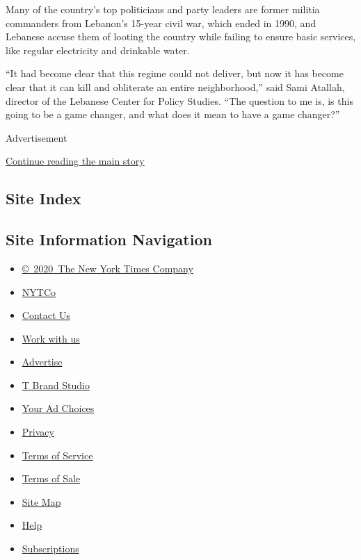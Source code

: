Many of the country's top politicians and party leaders are former
militia commanders from Lebanon's 15-year civil war, which ended in
1990, and Lebanese accuse them of looting the country while failing to
ensure basic services, like regular electricity and drinkable water.

``It had become clear that this regime could not deliver, but now it has
become clear that it can kill and obliterate an entire neighborhood,''
said Sami Atallah, director of the Lebanese Center for Policy Studies.
``The question to me is, is this going to be a game changer, and what
does it mean to have a game changer?''

Advertisement

\protect\hyperlink{after-bottom}{Continue reading the main story}

\hypertarget{site-index}{%
\subsection{Site Index}\label{site-index}}

\hypertarget{site-information-navigation}{%
\subsection{Site Information
Navigation}\label{site-information-navigation}}

\begin{itemize}
\tightlist
\item
  \href{https://help.nytimes.com/hc/en-us/articles/115014792127-Copyright-notice}{©~2020~The
  New York Times Company}
\end{itemize}

\begin{itemize}
\tightlist
\item
  \href{https://www.nytco.com/}{NYTCo}
\item
  \href{https://help.nytimes.com/hc/en-us/articles/115015385887-Contact-Us}{Contact
  Us}
\item
  \href{https://www.nytco.com/careers/}{Work with us}
\item
  \href{https://nytmediakit.com/}{Advertise}
\item
  \href{http://www.tbrandstudio.com/}{T Brand Studio}
\item
  \href{https://www.nytimes.com/privacy/cookie-policy\#how-do-i-manage-trackers}{Your
  Ad Choices}
\item
  \href{https://www.nytimes.com/privacy}{Privacy}
\item
  \href{https://help.nytimes.com/hc/en-us/articles/115014893428-Terms-of-service}{Terms
  of Service}
\item
  \href{https://help.nytimes.com/hc/en-us/articles/115014893968-Terms-of-sale}{Terms
  of Sale}
\item
  \href{https://spiderbites.nytimes.com}{Site Map}
\item
  \href{https://help.nytimes.com/hc/en-us}{Help}
\item
  \href{https://www.nytimes.com/subscription?campaignId=37WXW}{Subscriptions}
\end{itemize}
